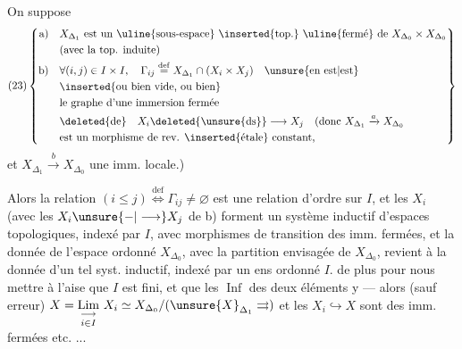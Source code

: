 On suppose
\[
(23)\left\{\begin{aligned}
\text{a)}\quad &X_{\Delta_1}\text{ est un \uline{sous-espace} \inserted{top.} \uline{fermé} de }X_{\Delta_0}\times X_{\Delta_0}\\
&\text{(avec la top. induite)}\\
\text{b)}\quad &\forall(i,j)\in I\times I,\quad\Gamma_{ij}\overset{\mathrm{def}}{=}X_{\Delta_1}\cap(X_i\times X_j)\quad\text{\unsure{en est|est}}\\
&\text{\inserted{ou bien vide, ou bien}}\\
&\text{le graphe d'une immersion fermée}\\
&\deleted{\text{de}}\quad X_i\deleted{\text{\unsure{ds}}}\longrightarrow X_j
\quad\text{(donc }X_{\Delta_1}\xrightarrow{a}X_{\Delta_0}\\
&\text{est un morphisme de rev. \inserted{étale} constant,}
\end{aligned}\right\}
\]
 et $X_{\Delta_1}\xrightarrow{b}X_{\Delta_0}$ une imm. locale.)

Alors la relation $(i\leq j)\overset{\mathrm{def}}{\Longleftrightarrow}\Gamma_{ij}\ne\varnothing$ est une
relation d'ordre sur $I$,  et les $X_i$
(avec les $X_i\unsure{-|\longrightarrow}X_j$ de b) forment un
système inductif d'espaces topologiques,
indexé par $I$, avec morphismes de
transition des imm. fermées, et
la donnée de l'espace  ordonné $X_{\Delta_0}$,
 avec la partition envisagée de $X_{\Delta_0}$,
revient à la donnée d'un tel syst.
inductif, indexé par un ens ordonné $I$.
 de plus pour nous mettre
à l'aise que $I$ est fini, et que les
$\operatorname{Inf}$ des deux éléments y  --- alors
(sauf erreur) $X=\underset{i\in I}{\underset{\longrightarrow}{\mathrm{Lim}}}\ X_i\simeq
X_{\Delta_0}/(\unsure{X}_{\Delta_1}\rightrightarrows)$
et les $X_i\hookrightarrow X$ sont des imm. fermées
etc. ...
